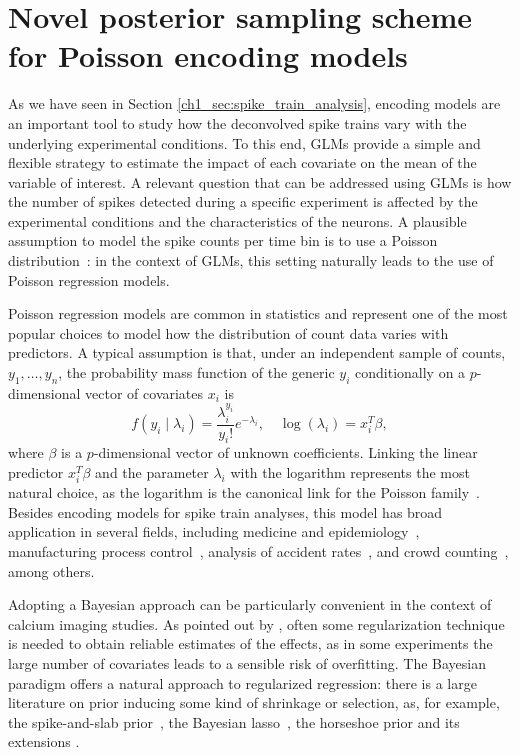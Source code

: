 \chapter{Novel posterior sampling scheme for Poisson encoding models}


As we have seen in Section \ref{ch1_sec:spike_train_analysis}, encoding models are an important tool to study how the deconvolved spike trains vary with the underlying experimental conditions. To this end, GLMs provide a simple and flexible strategy to estimate the impact of each covariate on the mean of the variable of interest.
A relevant question that can be addressed using GLMs is how the number of spikes detected during a specific experiment is affected by the experimental conditions and the characteristics of the neurons. A plausible assumption to model the spike counts per time bin is to use a Poisson distribution~\parencite{paninski2007}: in the context of GLMs, this setting naturally leads to the use of Poisson regression models. 

Poisson regression models are common in statistics and represent one of the most popular choices to model how the distribution of count data varies with predictors. A typical assumption is that, under an independent sample of counts, $y_1, \dots, y_n$, the probability mass function of the generic $y_i$ conditionally on a $p$-dimensional vector of covariates $x_i$ is
\begin{equation}
f(y_i \mid \lambda_i) =  \frac {\lambda_i^{y_i}}{{y_i}!}e^{-\lambda_i}, \quad \log(\lambda_i) = x_i^T \beta,
\label{ch2_eq:model0}
\end{equation}
where $\beta$ is a $p$-dimensional vector of unknown coefficients. Linking the linear predictor $x_i^T \beta$ and the parameter $\lambda_i$ with the logarithm represents the most natural choice, as the logarithm is the canonical link for the Poisson family~\parencite{nelder1972glm}.
Besides encoding models for spike train analyses, this model has broad application in several fields, including medicine and epidemiology~\parencite{Frome1983, frome1985, Hutchinson2005}, manufacturing process control~\parencite{lambert1992}, analysis of accident rates~\parencite{Sarath1990, Miaou1994}, and crowd counting~\parencite{chan2009}, among others.

Adopting a Bayesian approach can be particularly convenient in the context of calcium imaging studies. As pointed out by \textcite{paninski2007}, often some regularization technique is needed to obtain reliable estimates of the effects, as in some experiments the large number of covariates leads to a sensible risk of overfitting.
The Bayesian paradigm offers a natural approach to regularized regression: there is a large literature on prior inducing some kind of shrinkage or selection, as, for example, the spike-and-slab prior~\parencite{mitchell1988}, the Bayesian lasso~\parencite{park2008bayesian}, the horseshoe prior and its extensions \parencite{carvalho2010horseshoe, Piironen2017}.

